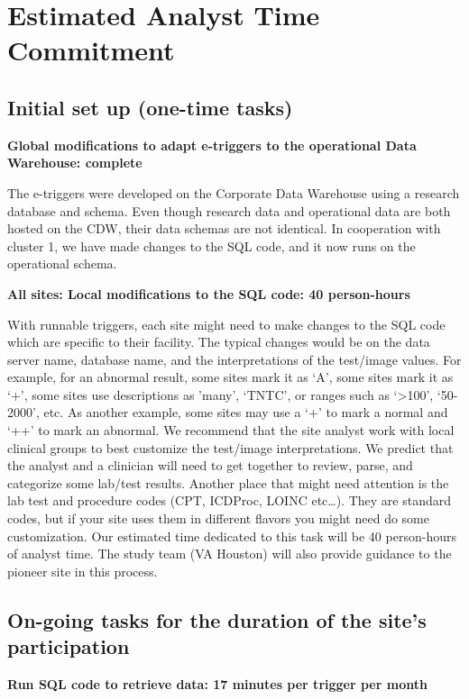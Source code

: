 \documentclass{article}
\begin{document}
\section{Estimated Analyst Time Commitment}

\subsection{Initial set up (one-time tasks)}

\textbf{Global modifications to adapt e-triggers to the operational
  Data Warehouse: complete}

The e-triggers were developed on the Corporate Data Warehouse using a
research database and schema. Even though research data and
operational data are both hosted on the CDW, their data schemas are
not identical. In cooperation with cluster 1, we have made changes to
the SQL code, and it now runs on the operational schema.

\noindent\textbf{All sites: Local modifications to the SQL code: 40
  person-hours}

With runnable triggers, each site might need to make changes to the
SQL code which are specific to their facility. The typical changes
would be on the data server name, database name, and the
interpretations of the test/image values. For example, for an abnormal
result, some sites mark it as `A', some sites mark it as `+', some
sites use descriptions as 'many', `TNTC', or ranges such as
`\textgreater{}100', `50-2000', etc. As another example, some sites
may use a `+' to mark a normal and `++' to mark an abnormal. We
recommend that the site analyst work with local clinical groups to
best customize the test/image interpretations. We predict that the
analyst and a clinician will need to get together to review, parse,
and categorize some lab/test results. Another place that might need
attention is the lab test and procedure codes (CPT, ICDProc, LOINC
etc\ldots{}). They are standard codes, but if your site uses them in
different flavors you might need do some customization. Our estimated
time dedicated to this task will be 40 person-hours of analyst time.
The study team (VA Houston) will also provide guidance to the
pioneer site in this process.

\subsection{On-going tasks for the duration of the site's participation}

\noindent\textbf{Run SQL code to retrieve data: 17 minutes per trigger
  per month}
\end{document}
